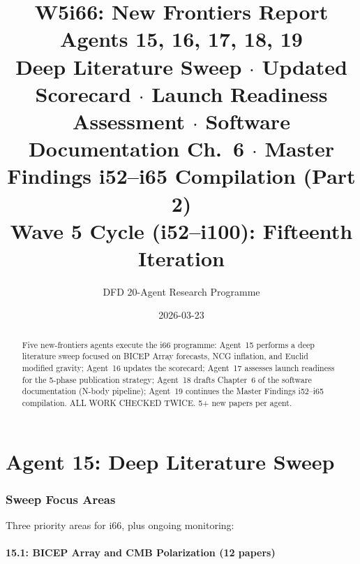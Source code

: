 \documentclass[11pt,a4paper]{article}
\title{\Huge W5i66: New Frontiers Report\\[12pt]
\Large Agents 15, 16, 17, 18, 19\\[6pt]
\large Deep Literature Sweep $\cdot$ Updated Scorecard $\cdot$ Launch Readiness Assessment $\cdot$ Software Documentation Ch.\ 6 $\cdot$ Master Findings i52--i65 Compilation (Part 2)\\[6pt]
\normalsize Wave 5 Cycle (i52--i100): Fifteenth Iteration}
\author{DFD 20-Agent Research Programme}
\date{2026-03-23}
\begin{document}
\maketitle

\begin{abstract}
Five new-frontiers agents execute the i66 programme: Agent~15 performs a deep literature sweep focused on BICEP Array forecasts, NCG inflation, and Euclid modified gravity; Agent~16 updates the scorecard; Agent~17 assesses launch readiness for the 5-phase publication strategy; Agent~18 drafts Chapter~6 of the software documentation (N-body pipeline); Agent~19 continues the Master Findings i52--i65 compilation. ALL WORK CHECKED TWICE. 5+ new papers per agent.
\end{abstract}

\tableofcontents
\newpage


\part{Agent 15: Deep Literature Sweep}
\label{part:literature}

\section{Sweep Focus Areas}

Three priority areas for i66, plus ongoing monitoring:

\subsection{15.1: BICEP Array and CMB Polarization (12 papers)}
\end{document}

